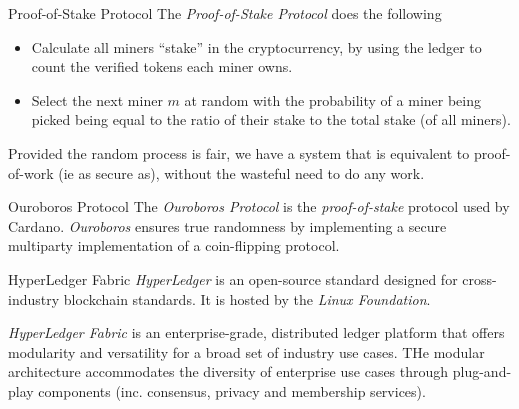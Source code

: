 \documentclass[11pt,a4paper]{article}
\begin{document}
  \begin{proposition}{Proof-of-Stake Protocol}
    The \textit{Proof-of-Stake Protocol} does the following
    \begin{itemize}
      \item Calculate all miners ``stake'' in the cryptocurrency, by using the ledger to count the verified tokens each miner owns.
      \item Select the next miner $m$ at random with the probability of a miner being picked being equal to the ratio of their stake to the total stake (of all miners).
    \end{itemize}
    Provided the random process is fair, we have a system that is equivalent to proof-of-work (ie as secure as), without the wasteful need to do any work.
  \end{proposition}

  \begin{proposition}{Ouroboros Protocol}
    The \textit{Ouroboros Protocol} is the \textit{proof-of-stake} protocol used by Cardano. \textit{Ouroboros} ensures true randomness by implementing a secure multiparty implementation of a coin-flipping protocol.
  \end{proposition}

  \begin{proposition}{HyperLedger Fabric}
    \textit{HyperLedger} is an open-source standard designed for cross-industry blockchain standards. It is hosted by the \textit{Linux Foundation}.
    \par \textit{HyperLedger Fabric} is an enterprise-grade, distributed ledger platform that offers modularity and versatility for a broad set of industry use cases. THe modular architecture accommodates the diversity of enterprise use cases through plug-and-play components (inc. consensus, privacy and membership services).
  \end{proposition}
\end{document}
